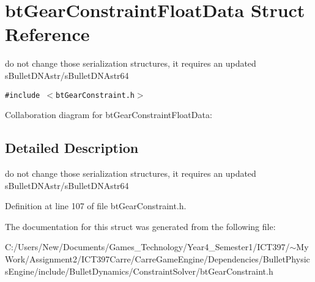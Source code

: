 \hypertarget{structbt_gear_constraint_float_data}{
\section{btGearConstraintFloatData Struct Reference}
\label{structbt_gear_constraint_float_data}
}
do not change those serialization structures, it requires an updated sBulletDNAstr/sBulletDNAstr64  


{\tt \#include $<$btGearConstraint.h$>$}

Collaboration diagram for btGearConstraintFloatData:

\subsection{Detailed Description}
do not change those serialization structures, it requires an updated sBulletDNAstr/sBulletDNAstr64 

Definition at line 107 of file btGearConstraint.h.

The documentation for this struct was generated from the following file:\begin{CompactItemize}
\item 
C:/Users/New/Documents/Games\_\-Technology/Year4\_\-Semester1/ICT397/$\sim$My Work/Assignment2/ICT397Carre/CarreGameEngine/Dependencies/BulletPhysicsEngine/include/BulletDynamics/ConstraintSolver/btGearConstraint.h\end{CompactItemize}
